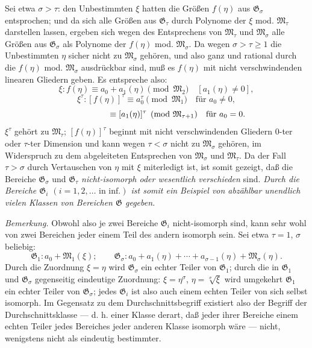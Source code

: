 Sei etwa $\sigma>\tau$: den Unbestimmten $\xi$ hatten die Größen $f(\eta)$ aus
$\mathfrak G_\sigma$ entsprochen; und da sich alle Größen aus $\mathfrak G_\tau$
durch Polynome der $\xi$ mod. $\mathfrak M_\tau$ darstellen lassen, ergeben sich
wegen des Entsprechens von $\mathfrak M_\tau$ und $\mathfrak M_\sigma$ alle
Größen aus $\mathfrak G_\sigma$ als Polynome der $f(\eta)$ mod.
$\mathfrak M_\sigma$. Da wegen $\sigma>\tau\ge1$ die Unbestimmten $\eta$ sicher
nicht zu $\mathfrak M_\sigma$ gehören, und also ganz und rational durch die
$f(\eta)$ mod. $\mathfrak M_\sigma$ ausdrückbar sind, muß es $f(\eta)$ mit
nicht verschwindenden linearen Gliedern geben. Es entspreche also:
\[
 \xi:f(\eta)\equiv a_0+a_1(\eta)\pmod{\mathfrak M_2}\quad[a_1(\eta)\ne0],
\]
\[
 \xi^\tau:[f(\eta)]^\tau\equiv a_0^\tau\pmod{\mathfrak M_1}\quad\text{für }a_0\ne0,
\]
\[
 \hphantom{\xi^\tau:[f(\eta)]^\tau}\equiv [a_1(\eta)]^\tau
 \pmod{\mathfrak M_{\tau+1}}\quad\text{für }a_0=0.
\]
$\xi^\tau$ gehört zu $\mathfrak M_\tau$; $[f(\eta)]^\tau$ beginnt mit nicht
verschwindenden Gliedern $0$-ter oder $\tau$-ter Dimension und kann wegen
$\tau<\sigma$ nicht zu $\mathfrak M_\sigma$ gehören, im Widerspruch zu dem
abgeleiteten Entsprechen von $\mathfrak M_\sigma$ und $\mathfrak M_\tau$. Da der
Fall $\tau>\sigma$ durch Vertauschen von $\eta$ mit $\xi$ miterledigt ist, ist
somit gezeigt, daß die Bereiche $\mathfrak G_\sigma$ und $\mathfrak G_\tau$
\emph{nicht-isomorph oder wesentlich verschieden} sind. \emph{Durch die
Bereiche $\mathfrak G_i$ $(i=1,2,\ldots\text{ in inf.})$ ist somit ein Beispiel
von abzählbar unendlich vielen Klassen von Bereichen $\mathfrak G$ gegeben.}

\emph{Bemerkung.} Obwohl also je zwei Bereiche $\mathfrak G_i$ nicht-isomorph
sind, kann sehr wohl von zwei Bereichen jeder einem Teil des andern isomorph
sein. Sei etwa $\tau=1$, $\sigma$ beliebig:
\[
\mathfrak G_1:a_0+\mathfrak M_1(\xi);\qquad
\mathfrak G_\sigma:a_0+a_1(\eta)+\cdots+a_{\sigma-1}(\eta)+\mathfrak M_\sigma(\eta).
\]
Durch die Zuordnung $\xi=\eta$ wird $\mathfrak G_\sigma$ ein echter Teiler von
$\mathfrak G_1$; durch die in $\mathfrak G_1$ und $\mathfrak G_\sigma$
gegenseitig eindeutige Zuordnung: $\xi=\eta^\sigma$, $\eta=\sqrt[\sigma]{\xi}$
wird umgekehrt $\mathfrak G_1$ ein echter Teiler von $\mathfrak G_\sigma$; jedes
$\mathfrak G_i$ ist also auch einem echten Teiler von sich selbst isomorph. Im
Gegensatz zu dem Durchschnittsbegriff existiert also der Begriff der
Durchschnittsklasse --- d. h. einer Klasse derart, daß jeder ihrer Bereiche einem
echten Teiler jedes Bereiches jeder anderen Klasse isomorph wäre --- nicht,
wenigstens nicht als eindeutig bestimmter.

